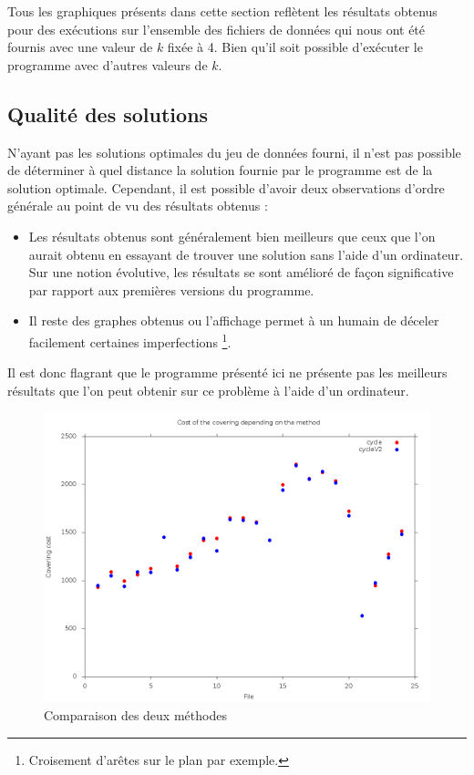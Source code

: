 \documentclass[a4paper,12pt]{article}
\begin{document}
Tous les graphiques présents dans cette section reflètent les résultats obtenus
pour des exécutions sur l'ensemble des fichiers de données qui nous ont été
fournis avec une valeur de $k$ fixée à 4. Bien qu'il soit possible d'exécuter
le programme avec d'autres valeurs de $k$.

\subsection{Qualité des solutions}
N'ayant pas les solutions optimales du jeu de données fourni, il n'est pas
possible de déterminer à quel distance la solution fournie par le programme est
de la solution optimale. Cependant, il est possible d'avoir deux observations
d'ordre générale au point de vu des résultats obtenus :
\begin{itemize}
\item Les résultats obtenus sont généralement bien meilleurs que ceux que l'on
  aurait obtenu en essayant de trouver une solution sans l'aide d'un ordinateur.
  Sur une notion évolutive, les résultats se sont amélioré de façon
  significative par rapport aux premières versions du programme.
\item Il reste des graphes obtenus ou l'affichage permet à un humain de déceler
  facilement certaines imperfections \footnote{Croisement d'arêtes sur le plan
    par exemple.}.
\end{itemize}
Il est donc flagrant que le programme présenté ici ne présente pas les meilleurs
résultats que l'on peut obtenir sur ce problème à l'aide d'un ordinateur.

\begin{figure}[H]
  \caption{Comparaison des deux méthodes}
  \includegraphics[width = \textwidth]{comparison.png}
\end{figure}
\end{document}
